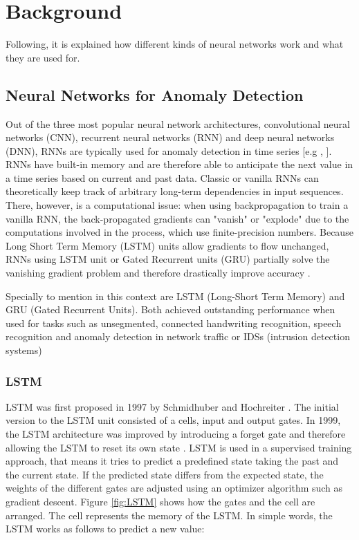 \section{Background} \label{background}

Following, it is explained how different kinds of neural networks work and what they are used for.

\subsection{Neural Networks for Anomaly Detection} \label{NN}

Out of the three most popular neural network architectures, convolutional neural networks (CNN), recurrent neural networks (RNN) and deep neural networks (DNN), RNNs are typically used for anomaly detection in time series [e.g \parencite{Malhotra2015}, \parencite{Verner2019}]. RNNs have built-in memory and are therefore able to anticipate the next value in a time series based on current and past data. Classic or vanilla RNNs can theoretically keep track of arbitrary long-term dependencies in input sequences. There, however, is a computational issue: when using backpropagation to train a vanilla RNN, the back-propagated gradients can "vanish" or "explode" due to the computations involved in the process, which use finite-precision numbers. Because Long Short Term Memory (LSTM) units allow gradients to flow unchanged, RNNs using LSTM unit or Gated Recurrent units (GRU) partially solve the vanishing gradient problem and therefore drastically improve accuracy \parencite{Hochreiter1997}.

Specially to mention in this context are LSTM (Long-Short Term Memory) and GRU (Gated Recurrent Units). Both achieved outstanding performance when used for tasks such as unsegmented, connected handwriting recognition, speech recognition and anomaly detection in network traffic or IDSs (intrusion detection systems) \parencite{JunyoungChung2014}

\subsubsection{LSTM} \label{LSTM}
LSTM was first proposed in 1997 by Schmidhuber and Hochreiter \parencite{Hochreiter1997}. The initial version to the LSTM unit consisted of a cells, input and output gates. In 1999, the LSTM architecture was improved by introducing a forget gate and therefore allowing the LSTM to reset its own state \parencite{Gers2000}. LSTM is used in a supervised training approach, that means it tries to predict a predefined state taking the past and the current state. If the predicted state differs from the expected state, the weights of the different gates are adjusted using an optimizer algorithm such as gradient descent. Figure \ref{fig:LSTM} shows how the gates and the cell are arranged. The cell represents the memory of the LSTM. In simple words, the LSTM works as follows to predict a new value: 

